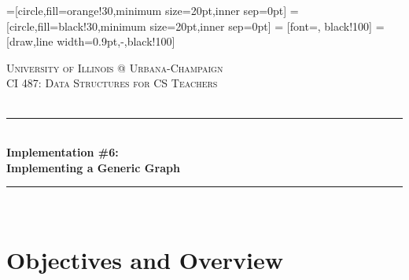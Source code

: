 \documentclass[a4paper]{article}
\begin{document}

=[circle,fill=orange!30,minimum size=20pt,inner sep=0pt]
=[circle,fill=black!30,minimum size=20pt,inner sep=0pt]
 = [font=\small, black!100]
 = [draw,line width=0.9pt,-,black!100]

\begin{titlepage}

\newcommand{\HRule}{\rule{\linewidth}{0.5mm}} 							%
\center 
 
\textsc{\LARGE University of Illinois @ Urbana-Champaign}\\[1cm]

\textsc{\Large CI 487: Data Structures for CS Teachers}\\[0.2cm]
\textsc{\large }\\[1cm] 										%
\HRule \\[0.8cm]
{ \huge \bfseries Implementation \#6:\\\vspace{0.1cm}Implementing a Generic Graph}\\[0.7cm]								%
\HRule \\[0.8cm]

\vfill
\begin{minipage}{0.49\textwidth}
    
\end{minipage}
\hfill
\begin{minipage}{0.49\textwidth}
    
\end{minipage}
\vfill
\begin{minipage}{0.49\textwidth}
    
\end{minipage}
\hfill
\begin{minipage}{0.49\textwidth}
    
\end{minipage}
\vfill

\vfill 
\end{titlepage}


\section{Objectives and Overview}
\end{document}
